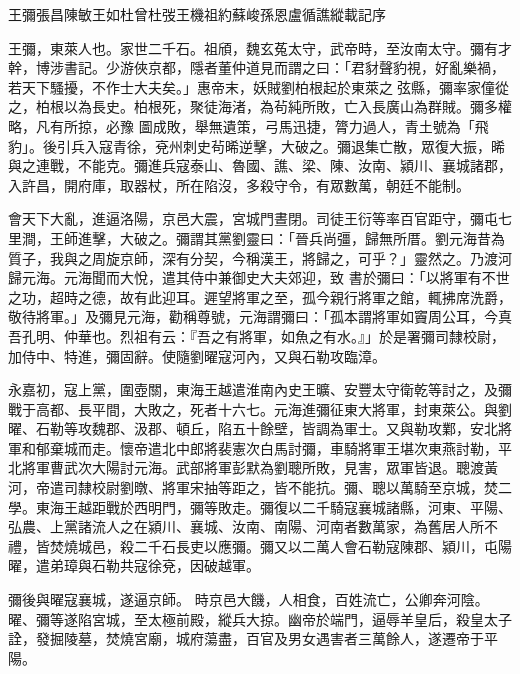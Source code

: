 
\begin{pinyinscope}

 王彌張昌陳敏王如杜曾杜弢王機祖約蘇峻孫恩盧循譙縱載記序



 王彌，東萊人也。家世二千石。祖頎，魏玄菟太守，武帝時，至汝南太守。彌有才幹，博涉書記。少游俠京都，隱者董仲道見而謂之曰：「君豺聲豹視，好亂樂禍，若天下騷擾，不作士大夫矣。」惠帝末，妖賊劉柏根起於東萊之弦縣，彌率家僮從之，柏根以為長史。柏根死，聚徒海渚，為茍純所敗，亡入長廣山為群賊。彌多權略，凡有所掠，必豫
 圖成敗，舉無遺策，弓馬迅捷，膂力過人，青土號為「飛豹」。後引兵入寇青徐，兗州刺史茍晞逆擊，大破之。彌退集亡散，眾復大振，晞與之連戰，不能克。彌進兵寇泰山、魯國、譙、梁、陳、汝南、潁川、襄城諸郡，入許昌，開府庫，取器杖，所在陷沒，多殺守令，有眾數萬，朝廷不能制。



 會天下大亂，進逼洛陽，京邑大震，宮城門晝閉。司徒王衍等率百官距守，彌屯七里澗，王師進擊，大破之。彌謂其黨劉靈曰：「晉兵尚彊，歸無所厝。劉元海昔為質子，我與之周旋京師，深有分契，今稱漢王，將歸之，可乎？」靈然之。乃渡河歸元海。元海聞而大悅，遣其侍中兼御史大夫郊迎，致
 書於彌曰：「以將軍有不世之功，超時之德，故有此迎耳。遲望將軍之至，孤今親行將軍之館，輒拂席洗爵，敬待將軍。」及彌見元海，勸稱尊號，元海謂彌曰：「孤本謂將軍如竇周公耳，今真吾孔明、仲華也。烈祖有云：『吾之有將軍，如魚之有水。』」於是署彌司隸校尉，加侍中、特進，彌固辭。使隨劉曜寇河內，又與石勒攻臨漳。



 永嘉初，寇上黨，圍壺關，東海王越遣淮南內史王曠、安豐太守衛乾等討之，及彌戰于高都、長平間，大敗之，死者十六七。元海進彌征東大將軍，封東萊公。與劉曜、石勒等攻魏郡、汲郡、頓丘，陷五十餘壁，皆調為軍士。又與勒攻鄴，安北將
 軍和郁棄城而走。懷帝遣北中郎將裴憲次白馬討彌，車騎將軍王堪次東燕討勒，平北將軍曹武次大陽討元海。武部將軍彭默為劉聰所敗，見害，眾軍皆退。聰渡黃河，帝遣司隸校尉劉暾、將軍宋抽等距之，皆不能抗。彌、聰以萬騎至京城，焚二學。東海王越距戰於西明門，彌等敗走。彌復以二千騎寇襄城諸縣，河東、平陽、弘農、上黨諸流人之在潁川、襄城、汝南、南陽、河南者數萬家，為舊居人所不禮，皆焚燒城邑，殺二千石長吏以應彌。彌又以二萬人會石勒寇陳郡、潁川，屯陽曜，遣弟璋與石勒共寇徐兗，因破越軍。



 彌後與曜寇襄城，遂逼京師。
 時京邑大饑，人相食，百姓流亡，公卿奔河陰。曜、彌等遂陷宮城，至太極前殿，縱兵大掠。幽帝於端門，逼辱羊皇后，殺皇太子詮，發掘陵墓，焚燒宮廟，城府蕩盡，百官及男女遇害者三萬餘人，遂遷帝于平陽。




\end{pinyinscope}
